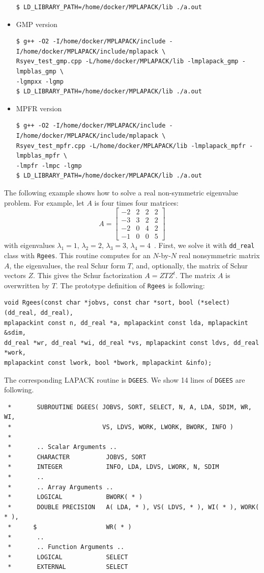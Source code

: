 \documentclass[12pt]{article}
\begin{document}
\begin{itemize}
\begin{verbatim}
$ LD_LIBRARY_PATH=/home/docker/MPLAPACK/lib ./a.out
\end{verbatim}
\item GMP version
\begin{verbatim}
$ g++ -O2 -I/home/docker/MPLAPACK/include -I/home/docker/MPLAPACK/include/mplapack \
Rsyev_test_gmp.cpp -L/home/docker/MPLAPACK/lib -lmplapack_gmp -lmpblas_gmp \
-lgmpxx -lgmp
$ LD_LIBRARY_PATH=/home/docker/MPLAPACK/lib ./a.out
\end{verbatim}
\item MPFR version
\begin{verbatim}
$ g++ -O2 -I/home/docker/MPLAPACK/include -I/home/docker/MPLAPACK/include/mplapack \
Rsyev_test_mpfr.cpp -L/home/docker/MPLAPACK/lib -lmplapack_mpfr -lmpblas_mpfr \
-lmpfr -lmpc -lgmp
$ LD_LIBRARY_PATH=/home/docker/MPLAPACK/lib ./a.out
\end{verbatim}
\end{itemize}

The following example shows how to solve a real non-symmetric eigenvalue problem. For example, let $A$ is four times four matrices:
\[
A = \left[\begin{array}{llll}-2 & 2 & 2 & 2 \\ -3 & 3 & 2 & 2 \\ -2 & 0 & 4 & 2 \\ -1 & 0 & 0 & 5\end{array}\right]
\]
with eigenvalues $\lambda_1 = 1$, $\lambda_2 = 2$, $\lambda_3 = 3$, $\lambda_4=4$~\cite{Gregory1969ACO}.
First, we solve it with {\tt dd\_real} class with {\tt Rgees}. This routine computes for an $N$-by-$N$ 
real nonsymmetric matrix $A$, the eigenvalues, the real Schur form $T$, and, optionally, the matrix of
Schur vectors $Z$. This gives the Schur factorization $A = Z T Z^t$. The matrix $A$ is overwritten by $T$.
The prototype definition of {\tt Rgees} is following:
\begin{verbatim}
void Rgees(const char *jobvs, const char *sort, bool (*select)(dd_real, dd_real), 
mplapackint const n, dd_real *a, mplapackint const lda, mplapackint &sdim, 
dd_real *wr, dd_real *wi, dd_real *vs, mplapackint const ldvs, dd_real *work, 
mplapackint const lwork, bool *bwork, mplapackint &info);
\end{verbatim}
The corresponding LAPACK routine is {\tt DGEES}. We show 14 lines of {\tt DGEES} are following. 
\begin{verbatim}
 *       SUBROUTINE DGEES( JOBVS, SORT, SELECT, N, A, LDA, SDIM, WR, WI,
 *                         VS, LDVS, WORK, LWORK, BWORK, INFO )
 *
 *       .. Scalar Arguments ..
 *       CHARACTER          JOBVS, SORT
 *       INTEGER            INFO, LDA, LDVS, LWORK, N, SDIM
 *       ..
 *       .. Array Arguments ..
 *       LOGICAL            BWORK( * )
 *       DOUBLE PRECISION   A( LDA, * ), VS( LDVS, * ), WI( * ), WORK( * ),
 *      $                   WR( * )
 *       ..
 *       .. Function Arguments ..
 *       LOGICAL            SELECT
 *       EXTERNAL           SELECT
\end{verbatim}
\end{document}
